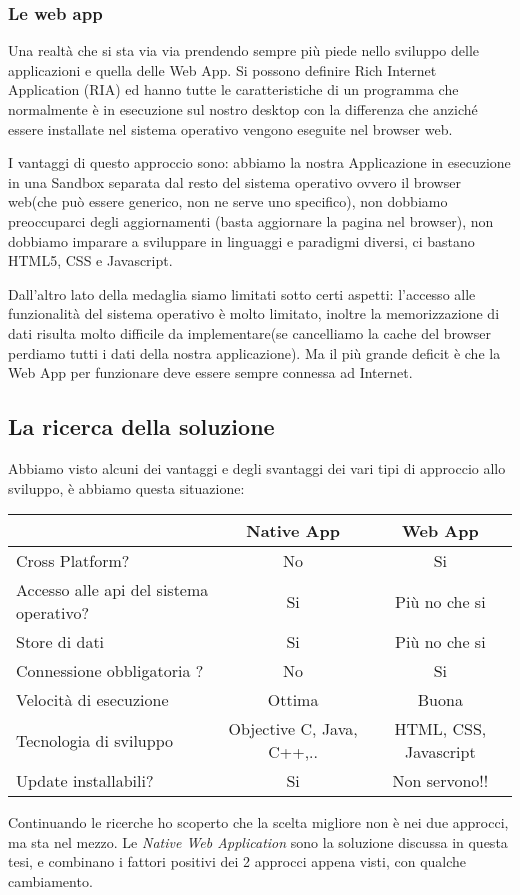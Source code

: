\subsubsection{Le web app}
Una realtà che si sta via via prendendo sempre più piede nello sviluppo delle applicazioni e quella delle Web App. Si possono definire Rich Internet Application (RIA) ed hanno tutte le caratteristiche di un programma che normalmente è in esecuzione sul nostro desktop con la differenza che anziché essere installate nel sistema operativo vengono eseguite nel browser web. 

I vantaggi di questo approccio sono: abbiamo la nostra Applicazione in esecuzione in una Sandbox separata dal resto del sistema operativo ovvero il browser web(che può essere generico, non ne serve uno specifico), non dobbiamo preoccuparci degli aggiornamenti (basta aggiornare la pagina nel browser), non dobbiamo imparare a sviluppare in linguaggi e paradigmi diversi, ci bastano HTML5, CSS e Javascript.

Dall'altro lato della medaglia siamo limitati sotto certi aspetti: l'accesso alle funzionalità del sistema operativo è molto limitato, inoltre la memorizzazione di dati risulta molto difficile da implementare(se cancelliamo la cache del browser perdiamo tutti i dati della nostra applicazione). Ma il più grande deficit è che la Web App per funzionare deve essere sempre connessa ad Internet. 
\subsection{La ricerca della soluzione}  
Abbiamo visto alcuni dei vantaggi e degli svantaggi dei vari tipi di approccio allo sviluppo, è abbiamo questa situazione:
\begin{center}
	\begin{tabular}{| l || c | c | }
		\hline
							&	Native App	&	Web App       \\
		\hline
		\hline
			Cross Platform?	&	No			&	Si            \\
		\hline
			Accesso alle api 
			del sistema 
			operativo?		&	Si			&	Più no che si \\
		\hline
			Store di dati	&	Si			&	Più no che si \\
		\hline
			Connessione 
			obbligatoria ?	&	No			&	Si 			  \\
		\hline
			Velocità di 
			esecuzione	    &	Ottima	 	& 	Buona \\
		\hline
			Tecnologia di 
			sviluppo		&	Objective C, 
			  					Java, C++,..	&	HTML, CSS, Javascript \\
		\hline
			Update 
			installabili?	&	Si			&	Non servono!! \\	
		\hline		
	\end{tabular}
\end{center}
Continuando le ricerche ho scoperto che la scelta migliore non è nei due approcci, ma sta nel mezzo.
Le \emph{Native Web Application} sono la soluzione discussa in questa tesi, e combinano i fattori positivi dei 2 approcci appena visti, con qualche cambiamento.
 